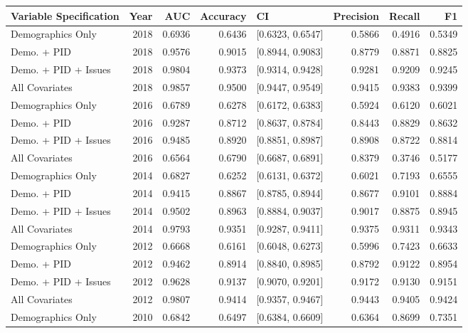 \begin{table}[H]
\centering
\begin{tabular}{lrrrlrrr}
  \toprule
Variable Specification & Year & AUC & Accuracy & CI & Precision & Recall & F1 \\ 
  \midrule
Demographics Only & 2018 & 0.6936 & 0.6436 & [0.6323, 0.6547] & 0.5866 & 0.4916 & 0.5349 \\ 
  Demo. + PID & 2018 & 0.9576 & 0.9015 & [0.8944, 0.9083] & 0.8779 & 0.8871 & 0.8825 \\ 
  Demo. + PID + Issues & 2018 & 0.9804 & 0.9373 & [0.9314, 0.9428] & 0.9281 & 0.9209 & 0.9245 \\ 
  All Covariates & 2018 & 0.9857 & 0.9500 & [0.9447, 0.9549] & 0.9415 & 0.9383 & 0.9399 \\ 
  Demographics Only & 2016 & 0.6789 & 0.6278 & [0.6172, 0.6383] & 0.5924 & 0.6120 & 0.6021 \\ 
  Demo. + PID & 2016 & 0.9287 & 0.8712 & [0.8637, 0.8784] & 0.8443 & 0.8829 & 0.8632 \\ 
  Demo. + PID + Issues & 2016 & 0.9485 & 0.8920 & [0.8851, 0.8987] & 0.8908 & 0.8722 & 0.8814 \\ 
  All Covariates & 2016 & 0.6564 & 0.6790 & [0.6687, 0.6891] & 0.8379 & 0.3746 & 0.5177 \\ 
  Demographics Only & 2014 & 0.6827 & 0.6252 & [0.6131, 0.6372] & 0.6021 & 0.7193 & 0.6555 \\ 
  Demo. + PID & 2014 & 0.9415 & 0.8867 & [0.8785, 0.8944] & 0.8677 & 0.9101 & 0.8884 \\ 
  Demo. + PID + Issues & 2014 & 0.9502 & 0.8963 & [0.8884, 0.9037] & 0.9017 & 0.8875 & 0.8945 \\ 
  All Covariates & 2014 & 0.9793 & 0.9351 & [0.9287, 0.9411] & 0.9375 & 0.9311 & 0.9343 \\ 
  Demographics Only & 2012 & 0.6668 & 0.6161 & [0.6048, 0.6273] & 0.5996 & 0.7423 & 0.6633 \\ 
  Demo. + PID & 2012 & 0.9462 & 0.8914 & [0.8840, 0.8985] & 0.8792 & 0.9122 & 0.8954 \\ 
  Demo. + PID + Issues & 2012 & 0.9628 & 0.9137 & [0.9070, 0.9201] & 0.9172 & 0.9130 & 0.9151 \\ 
  All Covariates & 2012 & 0.9807 & 0.9414 & [0.9357, 0.9467] & 0.9443 & 0.9405 & 0.9424 \\ 
  Demographics Only & 2010 & 0.6842 & 0.6497 & [0.6384, 0.6609] & 0.6364 & 0.8699 & 0.7351 \\ 

\end{tabular}
\end{table}
